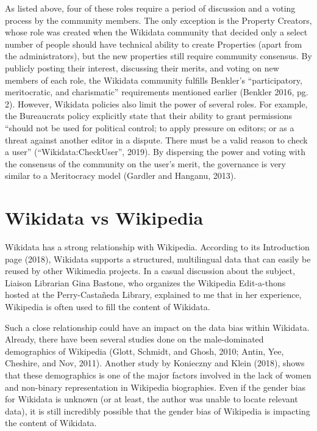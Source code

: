 \documentclass[]{article}
\begin{document}
As listed above, four of these roles require a period of discussion and
a voting process by the community members. The only exception is the
Property Creators, whose role was created when the Wikidata community
that decided only a select number of people should have technical
ability to create Properties (apart from the administrators), but the
new properties still require community consensus. By publicly posting
their interest, discussing their merits, and voting on new members of
each role, the Wikidata community fulfills Benkler's ``participatory,
meritocratic, and charismatic'' requirements mentioned earlier (Benkler
2016, pg. 2). However, Wikidata policies also limit the power of several
roles. For example, the Bureaucrats policy explicitly state that their
ability to grant permissions ``should not be used for political control;
to apply pressure on editors; or as a threat against another editor in a
dispute. There must be a valid reason to check a user''
(``Wikidata:CheckUser'', 2019). By dispersing the power and voting with
the consensus of the community on the user's merit, the governance is
very similar to a Meritocracy model (Gardler and Hanganu, 2013).

\hypertarget{wikidata-vs-wikipedia}{%
\section{Wikidata vs Wikipedia}\label{wikidata-vs-wikipedia}}

Wikidata has a strong relationship with Wikipedia. According to its
Introduction page (2018), Wikidata supports a structured, multilingual
data that can easily be reused by other Wikimedia projects. In a casual
discussion about the subject, Liaison Librarian Gina Bastone, who
organizes the Wikipedia Edit-a-thons hosted at the Perry-Castañeda
Library, explained to me that in her experience, Wikipedia is often used
to fill the content of Wikidata.

Such a close relationship could have an impact on the data bias within
Wikidata. Already, there have been several studies done on the
male-dominated demographics of Wikipedia (Glott, Schmidt, and Ghosh,
2010; Antin, Yee, Cheshire, and Nov, 2011). Another study by Konieczny
and Klein (2018), shows that these demographics is one of the major
factors involved in the lack of women and non-binary representation in
Wikipedia biographies. Even if the gender bias for Wikidata is unknown
(or at least, the author was unable to locate relevant data), it is
still incredibly possible that the gender bias of Wikipedia is impacting
the content of Wikidata.
\end{document}
